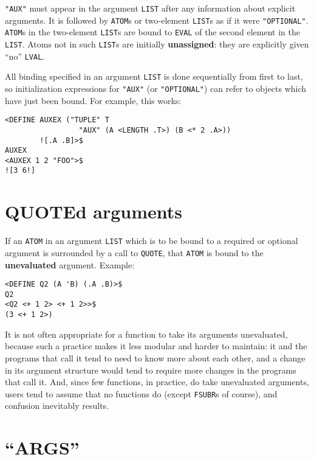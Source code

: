 \documentclass[a4paper]{scrbook}
\begin{document}
\texttt{"AUX"} must appear in the argument \texttt{LIST} after any information about explicit arguments. It is followed by
\texttt{ATOM}s or two-element \texttt{LIST}s as if it were \texttt{"OPTIONAL"}. 
\texttt{ATOM}s in the two-element \texttt{LIST}s are bound to \texttt{EVAL} of the second element in the \texttt{LIST}.
Atoms not in such \texttt{LIST}s are initially \textbf{unassigned}: they are explicitly given ``no'' \texttt{LVAL}.

All binding specified in an argument \texttt{LIST} is done sequentially from first to last, so initialization expressions
for \texttt{"AUX"} (or \texttt{"OPTIONAL"}) can refer to objects which have just been bound. For example, this works:

\begin{verbatim}
<DEFINE AUXEX ("TUPLE" T
                 "AUX" (A <LENGTH .T>) (B <* 2 .A>))
        ![.A .B]>$
AUXEX
<AUXEX 1 2 "FOO">$
![3 6!]
\end{verbatim}

\section{QUOTEd arguments}\label{quoted-arguments}

If an \texttt{ATOM} in an argument \texttt{LIST} which is to be bound to a required or optional argument is surrounded by a
call to \texttt{QUOTE}, that \texttt{ATOM} is bound to the \textbf{unevaluated} argument. Example:

\begin{verbatim}
<DEFINE Q2 (A 'B) (.A .B)>$
Q2
<Q2 <+ 1 2> <+ 1 2>>$
(3 <+ 1 2>)
\end{verbatim}

It is not often appropriate for a function to take its arguments unevaluated, because such a practice makes it less modular
and harder to maintain: it and the programs that call it tend to need to know more about each other, and a change in its
argument structure would tend to require more changes in the programs that call it. And, since few functions, in practice,
do take unevaluated arguments, users tend to assume that no functions do (except \texttt{FSUBR}s of course), and confusion
inevitably results.

\section{\texorpdfstring{``ARGS''}{9.5. ARGS}}\label{args}
\end{document}
